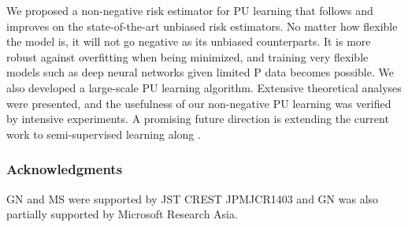 \documentclass{article}
\begin{document}
We proposed a non-negative risk estimator for PU learning that follows and improves on the state-of-the-art unbiased risk estimators. No matter how flexible the model is, it will not go negative as its unbiased counterparts. It is more robust against overfitting when being minimized, and training very flexible models such as deep neural networks given limited P data becomes possible. We also developed a large-scale PU learning algorithm. Extensive theoretical analyses were presented, and the usefulness of our non-negative PU learning was verified by intensive experiments. A promising future direction is extending the current work to semi-supervised learning along \cite{sakai17icml}.

\subsubsection*{Acknowledgments}

GN and MS were supported by JST CREST JPMJCR1403 and GN was also partially supported by Microsoft Research Asia.

{\small}

\clearpage
\appendix


\end{document}
